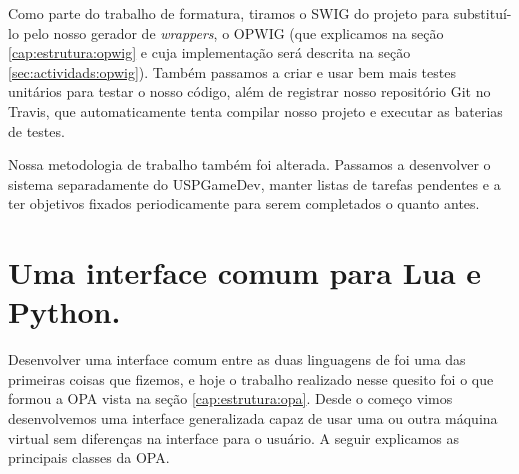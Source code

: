 
  Como parte do trabalho de formatura, tiramos o SWIG do projeto para substituí-lo
  pelo nosso gerador de \textit{wrappers}, o OPWIG (que explicamos na seção 
  \ref{cap:estrutura:opwig} e cuja implementação será descrita na seção 
  \ref{sec:actividads:opwig}). Também passamos a criar e usar bem mais testes
  unitários para testar o nosso código, além de registrar nosso repositório Git
  no Travis\footnotemark, que automaticamente tenta compilar nosso projeto e
  executar as baterias de testes.
  
  
  Nossa metodologia de trabalho também foi alterada. Passamos a desenvolver o
  sistema separadamente do USPGameDev, manter listas de tarefas pendentes e a
  ter objetivos fixados periodicamente para serem completados o quanto antes.
  
  \section{Uma interface comum para Lua e Python.}
  \label{sec:atividades:opa}
  Desenvolver uma interface comum entre as duas linguagens de \script{} foi uma das 
  primeiras coisas que fizemos, e hoje o trabalho realizado nesse quesito foi o que
  formou a OPA vista na seção \ref{cap:estrutura:opa}. Desde o começo vimos
  desenvolvemos uma interface generalizada capaz de usar uma ou outra máquina
  virtual sem diferenças na interface para o usuário. A seguir
  explicamos as principais classes da OPA.
  
